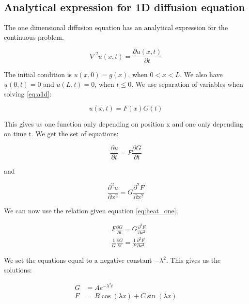 \documentclass{article}
\begin{document}
\subsection{Analytical expression for 1D diffusion equation}

The one dimensional diffusion equation has an analytical expression for the continuous problem. 

\begin{equation}
\nabla ^2 u(x,t)=\frac{\partial u(x,t)}{\partial t}
\label{eq:a1d}
\end{equation}

The initial condition is $u(x,0)=g(x)$, when $0<x<L$. We also have $u(0,t)=0$ and $u(L,t)=0$, when $t\leq0$. We use separation of variables when solving \ref{eq:a1d}:

\begin{equation}
u(x,t) = F(x)G(t)
\label{eq:sep}
\end{equation}

This gives us one function only depending on position x and one only depending on time t. We get the set of equations:

\begin{equation*}
\frac{\partial u}{\partial t} = F \frac{\partial G}{\partial t}
\end{equation*}

and

\begin{equation*}
\frac{\partial^2 u}{\partial x^2} = G \frac{\partial^2 F}{\partial x^2}
\end{equation*}

We can now use the relation given equation \ref{eq:heat_one}:

\begin{equation}
\begin{split}
&F\frac{\partial G}{\partial t} = G \frac{\partial ^2 F}{\partial x^2}\\
&\frac{1}{G}\frac{\partial G}{\partial t} = \frac{1}{F} \frac{\partial^2 F}{\partial x^2}
\end{split}
\end{equation}

We set the equations equal to a negative constant $-\lambda^2$. This gives us the solutions:

\begin{equation*}
\begin{split}
G &= Ae^{-\lambda^2 t}\\
F &= B\cos{(\lambda x)} + C\sin{(\lambda x)}
\end{split}
\end{equation*} 
\end{document}
